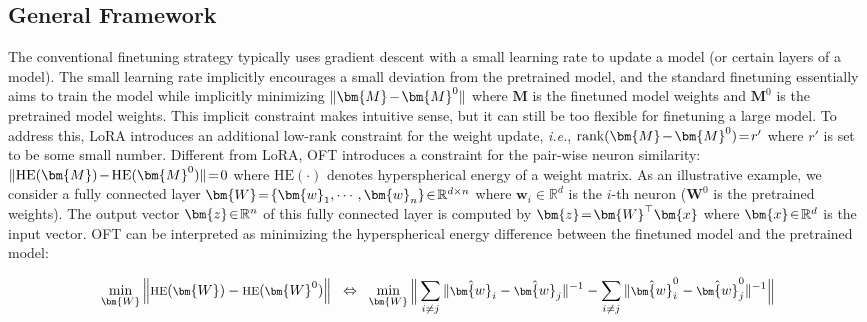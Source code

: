 \subsection{General Framework}

The conventional finetuning strategy typically uses gradient descent with a small learning rate to update a model (or certain layers of a model). The small learning rate implicitly encourages a small deviation from the pretrained model, and the standard finetuning essentially aims to train the model while implicitly minimizing $\thickmuskip=2mu \medmuskip=2mu \| \bm{M} - \bm{M}^0\|$ where $\bm{M}$ is the finetuned model weights and $\bm{M}^0$ is the pretrained model weights. This implicit constraint makes intuitive sense, but it can still be too flexible for finetuning a large model. To address this, LoRA introduces an additional low-rank constraint for the weight update, \emph{i.e.}, $\thickmuskip=2mu \medmuskip=2mu \text{rank}(\bm{M} - \bm{M}^0)=r'$ where $r'$ is set to be some small number. Different from LoRA, OFT introduces a constraint for the pair-wise neuron similarity: $\thickmuskip=2mu \medmuskip=2mu \| \text{HE}(\bm{M})-\text{HE}(\bm{M}^0) \|=0$ where $\text{HE}(\cdot)$ denotes hyperspherical energy of a weight matrix. As an illustrative example, we consider a fully connected layer $\thickmuskip=2mu \medmuskip=2mu \bm{W}=\{\bm{w}_1,\cdots,\bm{w}_n\}\in\mathbb{R}^{d\times n}$ where $\bm{w}_i\in\mathbb{R}^{d}$ is the $i$-th neuron ($\bm{W}^0$ is the pretrained weights). The output vector $\thickmuskip=2mu \medmuskip=2mu \bm{z}\in\mathbb{R}^n$ of this fully connected layer is computed by $\thickmuskip=2mu \medmuskip=2mu \bm{z}=\bm{W}^\top\bm{x}$ where $\thickmuskip=2mu \medmuskip=2mu \bm{x}\in\mathbb{R}^d$ is the input vector. OFT can be interpreted as minimizing the hyperspherical energy difference between the finetuned model and the pretrained model:

\begin{equation}\label{eq:oft_principle}
\footnotesize
\min_{\bm{W}} \left\| \text{HE}(\bm{W})-\text{HE}(\bm{W}^0)\right\|~~\Leftrightarrow~~\min_{\bm{W}} \bigg{\|} \sum_{i\neq j} \|\hat{\bm{w}}_i-\hat{\bm{w}}_j\|^{-1}-\sum_{i\neq j} \|\hat{\bm{w}}^0_i-\hat{\bm{w}}^0_j\|^{-1}\bigg{\|}
\end{equation}

